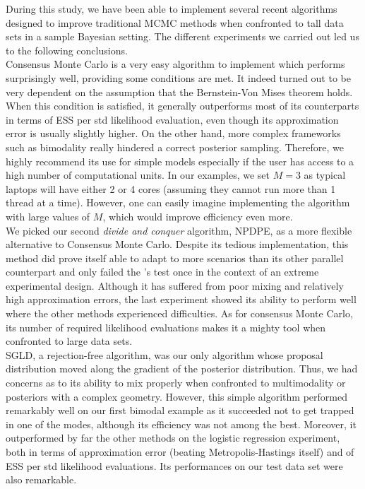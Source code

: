 \documentclass[11pt,a4paper]{report}\usepackage[]{graphicx}\usepackage[]{color}
\begin{document}
During this study, we have been able to implement several recent algorithms designed to improve traditional MCMC methods when confronted to tall data sets in a sample Bayesian setting. The different experiments we carried out led us to the following conclusions.\\

Consensus Monte Carlo is a very easy algorithm to implement which performs surprisingly well, providing some conditions are met. It indeed turned out to be very dependent on the assumption that the Bernstein-Von Mises theorem holds. When this condition is satisfied, it generally outperforms most of its counterparts in terms of ESS per std likelihood evaluation, even though its approximation error is usually slightly higher. On the other hand, more complex frameworks such as bimodality really hindered a correct posterior sampling. Therefore, we highly recommend its use for simple models especially if the user has access to a high number of computational units. In our examples, we set $M=3$ as typical laptops will have either 2 or 4 cores (assuming they cannot run more than 1 thread at a time). However, one can easily imagine implementing the algorithm with large values of $M$, which would improve efficiency even more.\\

We picked our second \textit{divide and conquer} algorithm, NPDPE, as a more flexible alternative to Consensus Monte Carlo. Despite its tedious implementation, this method did prove itself able to adapt to more scenarios than its other parallel counterpart and only failed the \cite{geweke2004getting}'s test once in the context of an extreme experimental design. Although it has suffered from poor mixing and relatively high approximation errors, the last experiment showed its ability to perform well where the other methods experienced difficulties. As for consensus Monte Carlo, its number of required likelihood evaluations makes it a mighty tool when confronted to large data sets.\\

SGLD, a rejection-free algorithm, was our only algorithm whose proposal distribution moved along the gradient of the posterior distribution. Thus, we had concerns as to its ability to mix properly when confronted to multimodality or posteriors with a complex geometry. However, this simple algorithm performed remarkably well on our first bimodal example as it succeeded not to get trapped in one of the modes, although its efficiency was not among the best. Moreover, it outperformed by far the other methods on the logistic regression experiment, both in terms of approximation error (beating Metropolis-Hastings itself) and of ESS per std likelihood evaluations. Its performances on our test data set were also remarkable.\\
\end{document}

